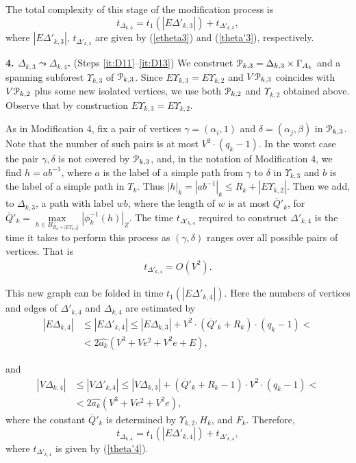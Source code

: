 \documentclass[a4paper,12pt]{article}
\renewcommand{\a}{\alpha }
\renewcommand{\b}{\beta }
\newcommand{\G}{\Gamma }
\newcommand{\g}{\gamma }
\newcommand{\D}{\Delta }
\renewcommand{\d}{\delta }
\newcommand{\U}{\Upsilon }
\newcommand{\cP}{{\cal{P}}}
\numberwithin{equation}{section}
\numberwithin{figure}{section}
\begin{document}
The total complexity of this stage of the modification process is
\begin{equation}\label{theta3}
t_{\D_{k,3}} = t_1(|E\D'_{k,3}|)
+ t_{\D'_{k,3}},
\end{equation}
where $|E\D'_{k,3}|$, $t_{\D'_{k,3}}$ are given by (\ref{etheta3}) and
(\ref{theta'3}), respectively.


{\bf 4. $\D_{k,3} \leadsto \D_{k,4}$.} (Steps \ref{it:D11}--\ref{it:D13})
We construct $\cP_{k,3}=\D_{k,3}\times
\G_{A_k}$ and a
spanning subforest $\U_{k,3}$ of $\cP_{k,3}$. Since $E\U_{k,3} =
E\U_{k,2}$ and $V\cP_{k,3}$ coincides with $V\cP_{k,2}$ plus some new isolated
vertices, we use both $\cP_{k,2}$ and $\U_{k,2}$ obtained above. Observe that by construction $E\U_{k,3} =
E\U_{k,2}$.


As in Modification 4, fix a pair of vertices $\g=(\a_i,1)$ and
$\d=(\a_j,\b)$ in $\cP_{k,3}$. Note that the number of such pairs is
at most $V^2 \cdot (q_k-1)$. In the worst case the pair $\g, \d$ is
not covered by $\cP_{k,3}$, and, in the notation of Modification 4, we
find $h=ab^{-1}$, where $a$ is the label of a simple path from
$\g$ to $\d$ in $\U_{k,3}$ and $b$ is the label of a simple path in
$T_k$. Thus $|h|_k = |ab^{-1}|_k \le R_k+ | E\U_{k,2}|$.  Then we add,
to $\D_{k,3}$, a path with label $wb$, where the length of $w$ is
 at most $\overline{Q}'_k$, for
$\overline{Q}'_k=\max\limits_{h \in B_{R_k+|
E\U_{k,2}|}}|\phi^{-1}_k(h)|_Z$.
The time $t_{\D'_{k,4}}$ required to construct $\D'_{k,4}$ is the time
it takes to perform this process as $(\g,\d)$ ranges over all
possible pairs of vertices. That is
\begin{equation}\label{theta'4}
\begin{split}
t_{\D'_{k,4}} =
 O(V^2).
\end{split}
\end{equation}

This new graph can be folded in time $t_1(|E\D'_{k,4}|)$. Here the
numbers of vertices and edges of $\D'_{k,4}$ and $\D_{k,4}$ are estimated
by
\begin{equation}\label{etheta4}
\begin{split}
|E\D_{k,4}| &\le |E\D'_{k,4}| \le |E\D_{k,3}|+ V^2 \cdot (\overline{Q}'_k +
R_k)\cdot(q_k-1)<\\
&< 2 \hat{a_k}(V^3+Ve^2+V^2 e+E),
\end{split}
\end{equation}

and
\begin{equation}\label{vtheta4}
\begin{split}
|V\D_{k,4}| &\le |V \D'_{k,4}| \le |V \D_{k,3}| +(\overline{Q}'_k+R_k-1)\cdot
V^2 \cdot(q_k-1)<\\
&< 2 \hat{a_k}(V^3+Ve^2+V^2 e),
\end{split}
\end{equation}
where the constant $\overline{Q}'_k$ is determined by $\U_{k,2}, H_k$, and
$F_k$.
Therefore,
\begin{equation}\label{theta4}
t_{\D_{k,4}} = t_1(|E\D'_{k,4}|) + t_{\D'_{k,4}},
\end{equation}
where $t_{\D'_{k,4}}$ is given by (\ref{theta'4}).
\end{document}
